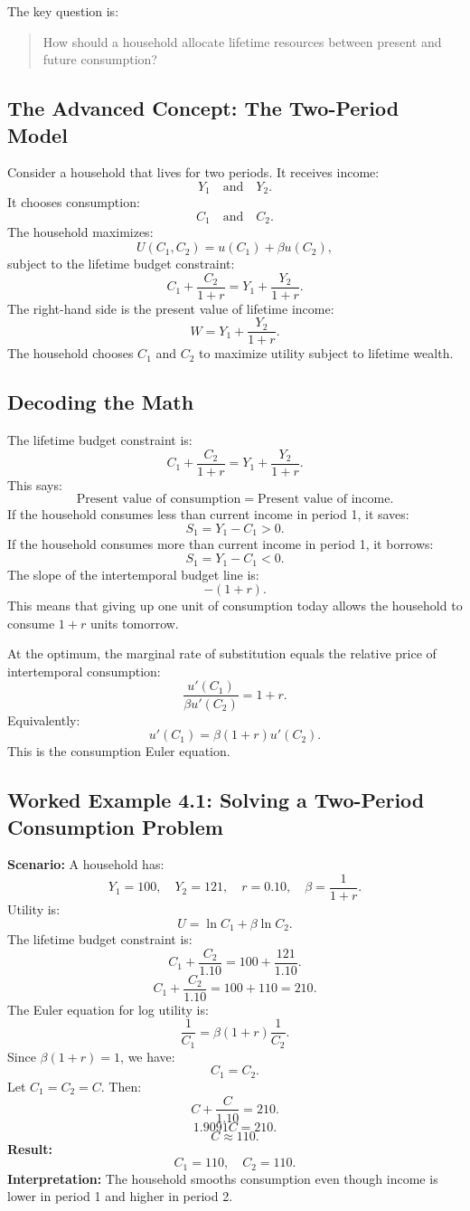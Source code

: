 \documentclass[12pt,a4paper]{article}
\begin{document}
The key question is:
\begin{quote}
How should a household allocate lifetime resources between present and future consumption?
\end{quote}

\subsection*{The Advanced Concept: The Two-Period Model}
Consider a household that lives for two periods. It receives income:
\[ Y_1 \quad \text{and} \quad Y_2. \]
It chooses consumption:
\[ C_1 \quad \text{and} \quad C_2. \]
The household maximizes:
\[ U(C_1, C_2) = u(C_1) + \beta u(C_2), \]
subject to the lifetime budget constraint:
\[ C_1 + \frac{C_2}{1+r} = Y_1 + \frac{Y_2}{1+r}. \]
The right-hand side is the present value of lifetime income:
\[ W = Y_1 + \frac{Y_2}{1+r}. \]
The household chooses $C_1$ and $C_2$ to maximize utility subject to lifetime wealth.

\subsection*{Decoding the Math}
The lifetime budget constraint is:
\[ C_1 + \frac{C_2}{1+r} = Y_1 + \frac{Y_2}{1+r}. \]
This says:
\[ \text{Present value of consumption} = \text{Present value of income}. \]
If the household consumes less than current income in period 1, it saves:
\[ S_1 = Y_1 - C_1 > 0. \]
If the household consumes more than current income in period 1, it borrows:
\[ S_1 = Y_1 - C_1 < 0. \]
The slope of the intertemporal budget line is:
\[ -(1+r). \]
This means that giving up one unit of consumption today allows the household to consume $1+r$ units tomorrow.

At the optimum, the marginal rate of substitution equals the relative price of intertemporal consumption:
\[ \frac{u'(C_1)}{\beta u'(C_2)} = 1+r. \]
Equivalently:
\[ u'(C_1) = \beta(1+r)u'(C_2). \]
This is the consumption Euler equation.

\subsection*{Worked Example 4.1: Solving a Two-Period Consumption Problem}
\textbf{Scenario:} A household has:
\[ Y_1 = 100, \quad Y_2 = 121, \quad r = 0.10, \quad \beta = \frac{1}{1+r}. \]
Utility is:
\[ U = \ln C_1 + \beta \ln C_2. \]
The lifetime budget constraint is:
\[ C_1 + \frac{C_2}{1.10} = 100 + \frac{121}{1.10}. \]
\[ C_1 + \frac{C_2}{1.10} = 100 + 110 = 210. \]
The Euler equation for log utility is:
\[ \frac{1}{C_1} = \beta(1+r) \frac{1}{C_2}. \]
Since $\beta(1+r) = 1$, we have:
\[ C_1 = C_2. \]
Let $C_1 = C_2 = C$. Then:
\[ C + \frac{C}{1.10} = 210. \]
\[ 1.9091C = 210. \]
\[ C \approx 110. \]
\textbf{Result:}
\[ C_1 = 110, \quad C_2 = 110. \]
\textbf{Interpretation:} The household smooths consumption even though income is lower in period 1 and higher in period 2.
\end{document}
